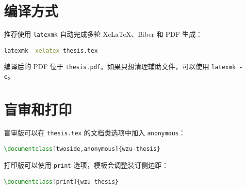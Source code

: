 \section{编译方式}

推荐使用 \texttt{latexmk} 自动完成多轮 XeLaTeX、Biber 和 PDF 生成：

\begin{lstlisting}[language=bash]
latexmk -xelatex thesis.tex
\end{lstlisting}

编译后的 PDF 位于 \texttt{thesis.pdf}。如果只想清理辅助文件，可以使用 \texttt{latexmk -c}。

\section{盲审和打印}

盲审版可以在 \texttt{thesis.tex} 的文档类选项中加入 \texttt{anonymous}：

\begin{lstlisting}[language=TeX]
\documentclass[twoside,anonymous]{wzu-thesis}
\end{lstlisting}

打印版可以使用 \texttt{print} 选项，模板会调整装订侧边距：

\begin{lstlisting}[language=TeX]
\documentclass[print]{wzu-thesis}
\end{lstlisting}
